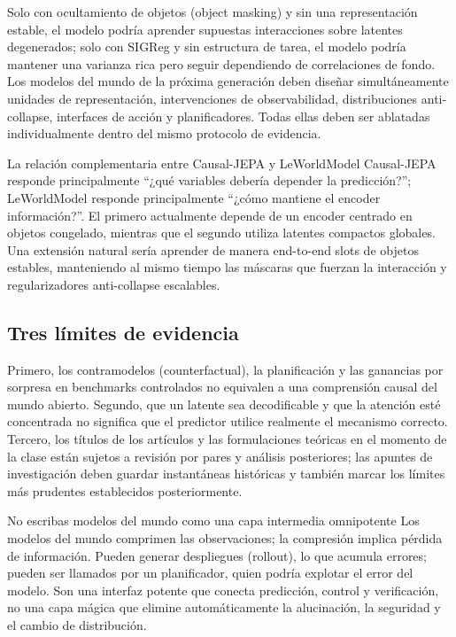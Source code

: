 \documentclass[a4paper]{article}
\begin{document}
Solo con ocultamiento de objetos (object masking) y sin una representación estable, el modelo podría aprender supuestas interacciones sobre latentes degenerados; solo con SIGReg y sin estructura de tarea, el modelo podría mantener una varianza rica pero seguir dependiendo de correlaciones de fondo. Los modelos del mundo de la próxima generación deben diseñar simultáneamente unidades de representación, intervenciones de observabilidad, distribuciones anti-collapse, interfaces de acción y planificadores. Todas ellas deben ser ablatadas individualmente dentro del mismo protocolo de evidencia.

\begin{knowledgebox}{La relación complementaria entre Causal-JEPA y LeWorldModel}
Causal-JEPA responde principalmente ``¿qué variables debería depender la predicción?''; LeWorldModel responde principalmente ``¿cómo mantiene el encoder información?''. El primero actualmente depende de un encoder centrado en objetos congelado, mientras que el segundo utiliza latentes compactos globales. Una extensión natural sería aprender de manera end-to-end slots de objetos estables, manteniendo al mismo tiempo las máscaras que fuerzan la interacción y regularizadores anti-collapse escalables.
\end{knowledgebox}

\subsection{Tres límites de evidencia}

Primero, los contramodelos (counterfactual), la planificación y las ganancias por sorpresa en benchmarks controlados no equivalen a una comprensión causal del mundo abierto. Segundo, que un latente sea decodificable y que la atención esté concentrada no significa que el predictor utilice realmente el mecanismo correcto. Tercero, los títulos de los artículos y las formulaciones teóricas en el momento de la clase están sujetos a revisión por pares y análisis posteriores; las apuntes de investigación deben guardar instantáneas históricas y también marcar los límites más prudentes establecidos posteriormente.

\begin{warningbox}{No escribas modelos del mundo como una capa intermedia omnipotente}
Los modelos del mundo comprimen las observaciones; la compresión implica pérdida de información. Pueden generar despliegues (rollout), lo que acumula errores; pueden ser llamados por un planificador, quien podría explotar el error del modelo. Son una interfaz potente que conecta predicción, control y verificación, no una capa mágica que elimine automáticamente la alucinación, la seguridad y el cambio de distribución.
\end{warningbox}
\end{document}
